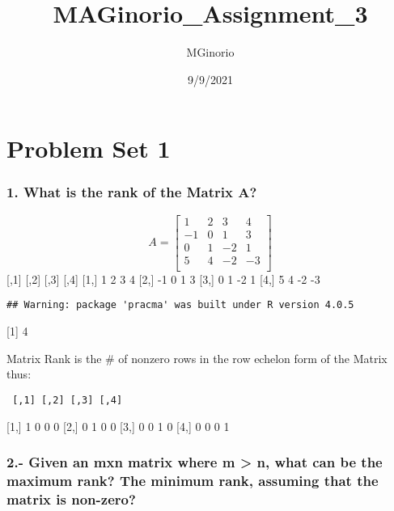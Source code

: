 \documentclass[
]{article}
\title{MAGinorio\_Assignment\_3}
\author{MGinorio}
\date{9/9/2021}
\begin{document}
\maketitle

\hypertarget{problem-set-1}{%
\section{Problem Set 1}\label{problem-set-1}}

\hypertarget{what-is-the-rank-of-the-matrix-a}{%
\subsubsection{1. What is the rank of the Matrix
A?}\label{what-is-the-rank-of-the-matrix-a}}

\[
A = 
\begin{bmatrix}
    1 & 2 & 3 & 4 \\
    -1 & 0 & 1 & 3 \\
    0 & 1 & -2 & 1 \\
    5 & 4 & -2 & -3 \\
\end{bmatrix}
\] {[},1{]} {[},2{]} {[},3{]} {[},4{]} {[}1,{]} 1 2 3 4 {[}2,{]} -1 0 1
3 {[}3,{]} 0 1 -2 1 {[}4,{]} 5 4 -2 -3

\begin{verbatim}
## Warning: package 'pracma' was built under R version 4.0.5
\end{verbatim}

{[}1{]} 4

Matrix Rank is the \# of nonzero rows in the row echelon form of the
Matrix thus:

\begin{verbatim}
 [,1] [,2] [,3] [,4]
\end{verbatim}

{[}1,{]} 1 0 0 0 {[}2,{]} 0 1 0 0 {[}3,{]} 0 0 1 0 {[}4,{]} 0 0 0 1

\hypertarget{given-an-mxn-matrix-where-m-n-what-can-be-the-maximum-rank-the-minimum-rank-assuming-that-the-matrix-is-non-zero}{%
\subsubsection{2.- Given an mxn matrix where m \textgreater{} n, what
can be the maximum rank? The minimum rank, assuming that the matrix is
non-zero?}\label{given-an-mxn-matrix-where-m-n-what-can-be-the-maximum-rank-the-minimum-rank-assuming-that-the-matrix-is-non-zero}}
\end{document}
